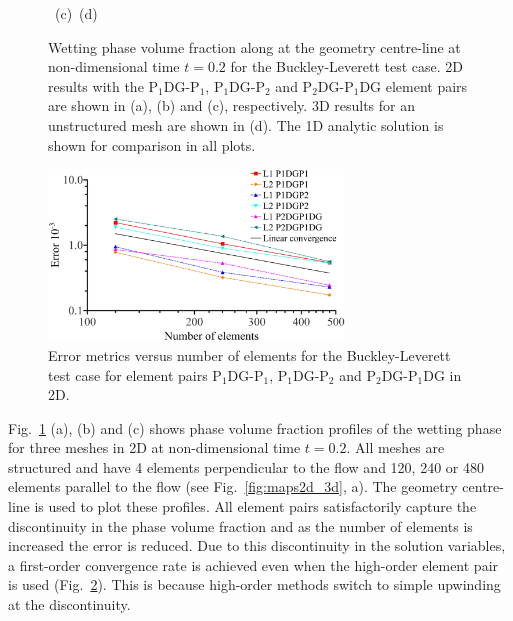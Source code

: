 \documentclass[preprint,authoryear,12pt]{elsarticle}
\newcommand{\PN}[2][error]{P$_{#1}$DG-P$_{#2}$}
\begin{document}
\begin{figure}[h!]
\begin{center}
{      \hbox{
        \vspace{-0.cm}\hbox{\hspace{2.5cm}(c)} 
        \vspace{-0.cm}\hbox{\hspace{6.5cm}(d)}}}
    \caption{Wetting phase volume fraction along at the geometry
      centre-line at non-dimensional time $t=0.2$ for the
      Buckley-Leverett test case.  2D results with the \PN[1]{1},
      \PN[1]{2} and \PN[2]{1}DG element pairs are shown in (a), (b)
      and (c), respectively.  3D results for an unstructured mesh are
      shown in (d). The 1D analytic solution is shown for comparison
      in all plots.\label{fig:BL_tests}}
  \end{center}
\end{figure}

\begin{figure}[h!]
  \begin{center}
    \includegraphics[width=0.70\textwidth]{BL_2D_Errors.eps}
    \caption{Error metrics versus number of elements for the
      Buckley-Leverett test case for element pairs \PN[1]{1},
      \PN[1]{2} and \PN[2]{1}DG in 2D. \label{fig:errors_BL_2D}}
  \end{center}
\end{figure}

Fig.~\ref{fig:BL_tests} (a), (b) and (c) shows phase volume fraction
profiles of the wetting phase for three meshes in 2D at
non-dimensional time $t=0.2$. All meshes are structured and have 4
elements perpendicular to the flow and 120, 240 or 480 elements
parallel to the flow (see Fig.~\ref{fig:maps2d_3d}, a). The geometry
centre-line is used to plot these profiles. All element pairs
satisfactorily capture the discontinuity in the phase volume fraction
and as the number of elements is increased the error is reduced. Due
to this discontinuity in the solution variables, a first-order
convergence rate is achieved even when the high-order element pair is
used (Fig.~\ref{fig:errors_BL_2D}). This is because high-order methods
switch to simple upwinding at the discontinuity.
\end{document}
